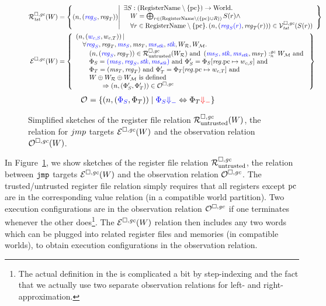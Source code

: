 \begin{figure}
  \centering
\begin{align*}
  \lrrg{\trust}(W) &= \left\{ \npair{\stpair{\reg}{\reg}} \middle|
    \begin{array}{l}
      \exists S : (\RegName \setminus \{\pcreg \})\fun \World \ldotp \\
      \quad W = \bigoplus_{r \in (\RegName\setminus (\{\pcreg \} \cup R))} S(r) \wedge \\
      \quad \forall r \in \RegName \setminus \{\pcreg \}\ldotp \npair{\stpair[.]{\src{\reg_S(r)}}{\reg_T(r)}} \in \lrvg{\trust}(S(r))
    \end{array}
            \right\}\\
  \lre(W)&= \left\{ \begin{array}{l}
    \npair{\stpair[.]{w_{c,S}}{w_{c,T}}} | \\
    \quad\forall \src{\reg_S}, \reg_T, \src{\ms_S}, \ms_T, \src{\ms_\stk}, \src{\stk}, W_\lrrs , W_\lrm \ldotp \\
    \qquad\npair{\stpair{\reg}{\reg}} \in \lrr(W_\lrrs ) \tand \memSat{\stpair[.]{\ms_S,\stk,\ms_\stk}{\ms_T}}{W_\lrm} \tand\\
    \qquad\Phi_S = \src{(\ms_S,\reg_S,\stk, \ms_\stk)} \tand \Phi_S' = \Phi_S \updReg{\pcreg}{w_{c,S}} \tand\\
                     \qquad\Phi_T = (\ms_T,\reg_T) \tand \Phi_T' = \Phi_T\updReg{\pcreg}{w_{c,T}} \tand \\
                     \qquad W \oplus W_\lrrs \oplus W_\lrm \text{ is defined }\\
    \qquad\qquad\Rightarrow\npair{\left(\Phi_S', \Phi_T' \right)}\in \lro
  \end{array}
  \right\}
\end{align*}
  \begin{align*}
  \lro[] ={}&\{ \npair{\left(\src{\Phi_S},\Phi_T\right)} \mid
    \src{\Phi_S \sterm{}} \Leftrightarrow \Phi_T \trg{\term} \}
\end{align*}
\caption{Simplified sketches of the register file relation $\lrr(W)$, the relation
  for $\com{jmp}$ targets $\lre(W)$  and the observation relation $\lro(W)$.}
\label{fig:obs-rel}
\end{figure}

In Figure~\ref{fig:obs-rel}, we show sketches of the register file relation $\lrr$, the relation between $\tjmp{}$ targets $\lre(W)$ and the observation relation $\lro$.
The trusted/untrusted register file relation simply requires that all registers except $\pcreg$ are in the corresponding value relation (in a compatible world partition).
Two execution configurations are in the observation relation $\lro$ if one terminates whenever the other does\footnote{The actual definition in the \cite{technical_report} is complicated a bit by step-indexing and the fact that we actually use two separate observation relations for left- and right-approximation.}.
The $\lre(W)$ relation then includes any two words which can be plugged into related register files and memories (in compatible worlds), to obtain execution configurations in the observation relation.

